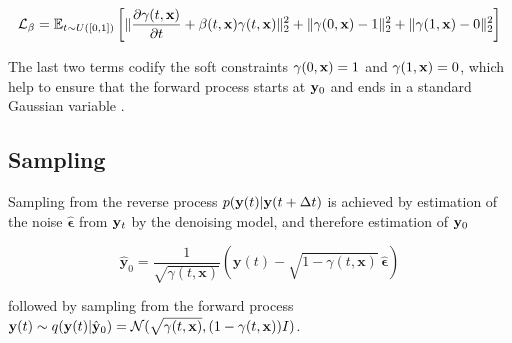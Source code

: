\begin{equation*}
\mathcal{L}_\beta = \mathbb{E}_{t \sim U([0,1])} \left[
\lVert \frac{\partial \gamma(t,\bold{x})}{\partial t} + \beta(t,\bold{x})\gamma(t,\bold{x}) \rVert_2^2
+ \lVert \gamma(0,\bold{x}) - 1 \rVert_2^2 
+ \lVert \gamma(1,\bold{x}) - 0 \rVert_2^2
\right]
\end{equation*}

The last two terms codify the soft constraints $\gamma(0,\bold{x})= 1$ and $\gamma(1,\bold{x}) = 0$, which help to ensure that the forward process starts at $\bold{y}_{0}$ and ends in a standard Gaussian variable \parencite{Maggiora2023}. 

\subsection{Sampling}

Sampling from the reverse process $p(\bold{y}(t)\lvert\bold{y}(t+\Delta t)$ is achieved by estimation of the noise $\hat{\boldsymbol{\epsilon}}$ from $\bold{y}_{t}$ by the denoising model, and therefore estimation of $\bold{y}_{0}$

\begin{equation}
\hat{\mathbf{y}}_{0} = \frac{1}{\sqrt{\gamma(t, \mathbf{x})}} \left( \mathbf{y}(t) - \sqrt{1-\gamma(t, \mathbf{x})} \, \hat{\boldsymbol{\epsilon}} \right)
\end{equation}

followed by sampling from the forward process $\bold{y}(t) \sim q(\bold{y}(t)\lvert\hat{\bold{y}}_{0}) = \mathcal{N}(\sqrt{\gamma(t,\bold{x})},(1-\gamma(t,\bold{x}))I)$. 








